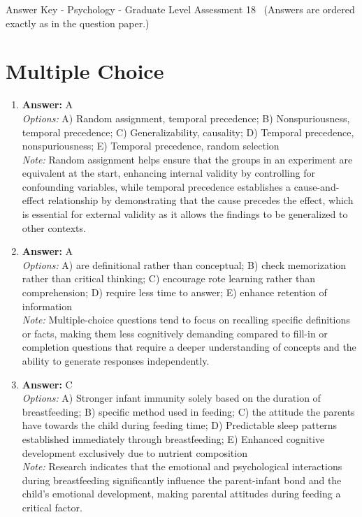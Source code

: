 \documentclass[12pt]{article}
\begin{document}
\begin{center}
Answer Key - Psychology - Graduate Level Assessment 18 \
\small (Answers are ordered exactly as in the question paper.)
\end{center}

\section*{Multiple Choice}
\begin{enumerate}[label=\arabic*.]
\item \textbf{Answer:} A
\\ \textit{Options:} A) Random assignment, temporal precedence; B) Nonspuriousness, temporal precedence; C) Generalizability, causality; D) Temporal precedence, nonspuriousness; E) Temporal precedence, random selection
\\ \textit{Note:} Random assignment helps ensure that the groups in an experiment are equivalent at the start, enhancing internal validity by controlling for confounding variables, while temporal precedence establishes a cause-and-effect relationship by demonstrating that the cause precedes the effect, which is essential for external validity as it allows the findings to be generalized to other contexts.
\item \textbf{Answer:} A
\\ \textit{Options:} A) are definitional rather than conceptual; B) check memorization rather than critical thinking; C) encourage rote learning rather than comprehension; D) require less time to answer; E) enhance retention of information
\\ \textit{Note:} Multiple-choice questions tend to focus on recalling specific definitions or facts, making them less cognitively demanding compared to fill-in or completion questions that require a deeper understanding of concepts and the ability to generate responses independently.
\item \textbf{Answer:} C
\\ \textit{Options:} A) Stronger infant immunity solely based on the duration of breastfeeding; B) specific method used in feeding; C) the attitude the parents have towards the child during feeding time; D) Predictable sleep patterns established immediately through breastfeeding; E) Enhanced cognitive development exclusively due to nutrient composition
\\ \textit{Note:} Research indicates that the emotional and psychological interactions during breastfeeding significantly influence the parent-infant bond and the child's emotional development, making parental attitudes during feeding a critical factor.

\end{enumerate}
\end{document}
